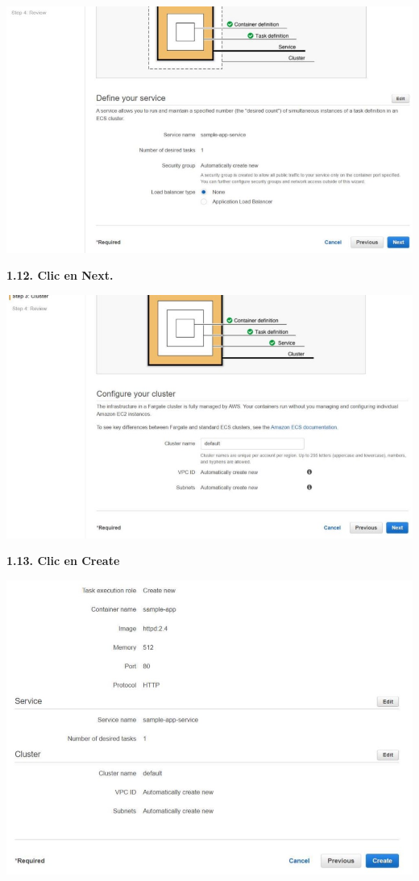 \documentclass{article}
\begin{document}
    \begin{center}
		\includegraphics[width=15cm]{./images/12} 
	\end{center}
	
	
	\textbf{1.12. Clic en Next.
}

    \begin{center}
		\includegraphics[width=15cm]{./images/13} 
	\end{center}
	
	\textbf{1.13.  Clic en Create
}

    \begin{center}
		\includegraphics[width=15cm]{./images/14} 
	\end{center}
	
\end{document}
